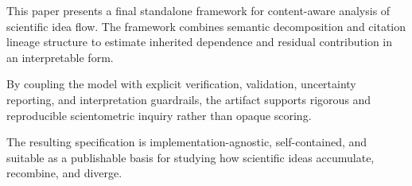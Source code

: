 
This paper presents a final standalone framework for content-aware analysis of scientific idea flow. The framework combines semantic decomposition and citation lineage structure to estimate inherited dependence and residual contribution in an interpretable form.

By coupling the model with explicit verification, validation, uncertainty reporting, and interpretation guardrails, the artifact supports rigorous and reproducible scientometric inquiry rather than opaque scoring.

The resulting specification is implementation-agnostic, self-contained, and suitable as a publishable basis for studying how scientific ideas accumulate, recombine, and diverge.
